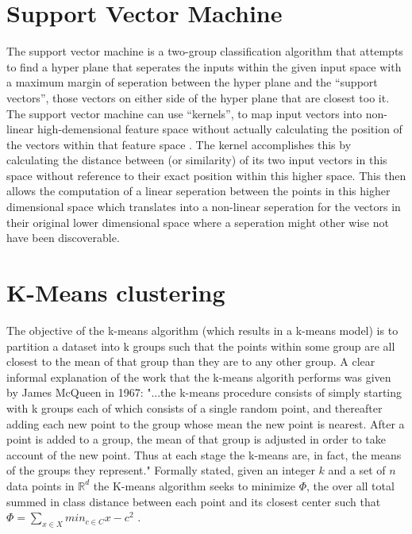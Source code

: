\section{Support Vector Machine}
The support vector machine is a two-group classification algorithm that attempts to find a hyper
plane that seperates the inputs within the given input space with a maximum margin of seperation
between the hyper plane and the ``support vectors'', those vectors on either side of the hyper plane
that are closest too it. The support vector machine can use ``kernels'', to map input vectors into
non-linear high-demensional feature space without actually calculating the position of
the vectors within that feature space \cite{Vapnik}. The kernel accomplishes this by calculating the
distance between (or similarity) of its two input vectors in this space without reference to their exact
position within this higher space. This then allows the computation of a linear seperation between
the points in this higher dimensional space which translates into a non-linear seperation for the
vectors in their original lower dimensional space where a seperation might other wise not have been
discoverable.

\section{K-Means clustering}
The objective of the k-means algorithm (which results in a k-means model) is to partition
a dataset into k groups such that the points within some group are all closest to
the mean of that group than they are to any other group. A clear
informal explanation of the work that the k-means algorith performs
was given by James McQueen in 1967: "...the k-means procedure
consists of simply starting with k groups each of which consists of a
single random point, and thereafter adding each new point to the
group whose mean the new point is nearest. After a point is added to
a group, the mean of that group is adjusted in order to take account
of the new point. Thus at each stage the k-means are, in fact, the
means of the groups they represent." \cite{MacQueen} Formally stated,
given an integer $k$ and a set of $n$ data points in
$\mathbb{R}^{d}$ the K-means algorithm seeks to minimize  $\Phi$, the
over all total summed in class distance between each point and its
closest center such that $\mathbb \Phi = \sum_{x \in X} min_{c \in C}{x-c^{2}}$
\cite{Arthur}.

